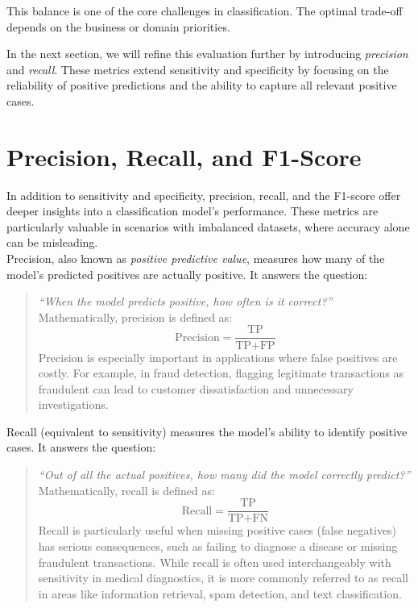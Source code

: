 \documentclass[
  11pt,
]{book}
\renewenvironment{quote}{\begin{quotation}}{\end{quotation}}
\theoremstyle{definition}
\theoremstyle{definition}
\theoremstyle{definition}
\theoremstyle{definition}
\theoremstyle{remark}
\begin{document}
This balance is one of the core challenges in classification. The optimal trade-off depends on the business or domain priorities.

In the next section, we will refine this evaluation further by introducing \emph{precision} and \emph{recall}. These metrics extend sensitivity and specificity by focusing on the reliability of positive predictions and the ability to capture all relevant positive cases.

\section{Precision, Recall, and F1-Score}\label{precision-recall-and-f1-score}

In addition to sensitivity and specificity, precision, recall, and the F1-score offer deeper insights into a classification model's performance. These metrics are particularly valuable in scenarios with imbalanced datasets, where accuracy alone can be misleading.\\
Precision, also known as \emph{positive predictive value}, measures how many of the model's predicted positives are actually positive. It answers the question:

\begin{quote}
\emph{``When the model predicts positive, how often is it correct?''}\\
Mathematically, precision is defined as:\\
\[
\text{Precision} = \frac{\text{TP}}{\text{TP} + \text{FP}}
\]
Precision is especially important in applications where false positives are costly. For example, in fraud detection, flagging legitimate transactions as fraudulent can lead to customer dissatisfaction and unnecessary investigations.
\end{quote}

Recall (equivalent to sensitivity) measures the model's ability to identify positive cases. It answers the question:

\begin{quote}
\emph{``Out of all the actual positives, how many did the model correctly predict?''}\\
Mathematically, recall is defined as:\\
\[
\text{Recall} = \frac{\text{TP}}{\text{TP} + \text{FN}}
\]
Recall is particularly useful when missing positive cases (false negatives) has serious consequences, such as failing to diagnose a disease or missing fraudulent transactions. While recall is often used interchangeably with sensitivity in medical diagnostics, it is more commonly referred to as recall in areas like information retrieval, spam detection, and text classification.
\end{quote}
\end{document}
